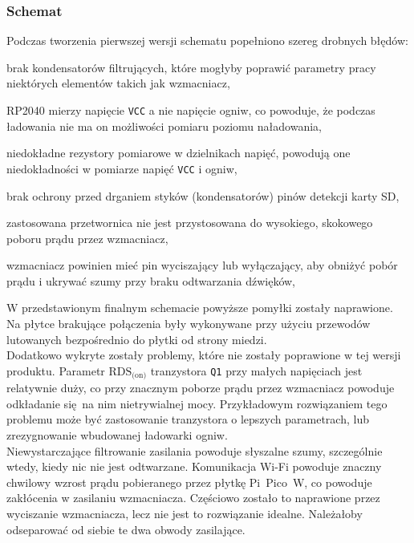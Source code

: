\documentclass[polish]{aghengthesis}
\let\tempone\itemize
\let\temptwo\enditemize
\renewenvironment{itemize}{\tempone\setlength{\itemsep}{0cm}}{\temptwo}
\begin{document}
			\subsubsection{Schemat}
				\noindent
				Podczas tworzenia pierwszej wersji schematu popełniono szereg drobnych błędów:
				\begin{itemize}
					\item brak kondensatorów filtrujących, które mogłyby poprawić parametry pracy niektórych elementów takich jak wzmacniacz,
					\item RP2040 mierzy napięcie \lstinline|VCC| a nie napięcie ogniw, co powoduje, że podczas ładowania nie ma on możliwości pomiaru poziomu naładowania,
					\item niedokładne rezystory pomiarowe w dzielnikach napięć, powodują one niedokładności w pomiarze napięć \lstinline|VCC| i ogniw,
					\item brak ochrony przed drganiem styków (kondensatorów) pinów detekcji karty SD,
					\item zastosowana przetwornica nie jest przystosowana do wysokiego, skokowego poboru prądu przez wzmacniacz,
					\item wzmacniacz powinien mieć pin wyciszający lub wyłączający, aby obniżyć pobór prądu i ukrywać szumy przy braku odtwarzania dźwięków,
				\end{itemize}
				
				W przedstawionym finalnym schemacie powyższe pomyłki zostały naprawione. Na płytce brakujące połączenia były wykonywane przy użyciu przewodów lutowanych bezpośrednio do płytki od strony miedzi.
				$ $\\
				
				Dodatkowo wykryte zostały problemy, które nie zostały poprawione w tej wersji produktu. Parametr $\text{RDS}_{\text{(on)}}$ tranzystora \lstinline|Q1| przy małych napięciach jest relatywnie duży, co przy znacznym poborze prądu przez wzmacniacz powoduje odkładanie się na nim nietrywialnej mocy. Przykładowym rozwiązaniem tego problemu może być zastosowanie tranzystora o lepszych parametrach, lub zrezygnowanie wbudowanej ładowarki ogniw.
				$ $\\
				
				Niewystarczające filtrowanie zasilania powoduje słyszalne szumy, szczególnie wtedy, kiedy nic nie jest odtwarzane. Komunikacja Wi-Fi powoduje znaczny chwilowy wzrost prądu pobieranego przez płytkę Pi~Pico~W, co powoduje zakłócenia w zasilaniu wzmacniacza. Częściowo zostało to naprawione przez wyciszanie wzmacniacza, lecz nie jest to rozwiązanie idealne. Należałoby odseparować od siebie te dwa obwody zasilające.
				
\end{document}
